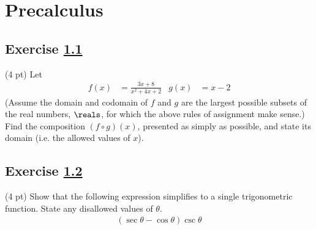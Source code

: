 %
%
%
%

%
%

\section{Precalculus}

\subsection{Exercise \ref{sec : Precalculus Q1}}
\label{sec : Precalculus Q1}


(4 pt) Let
\begin{align*}
f(x)
&=
\frac{3 x + 8}{x^{2} + 4 x + 2}
&
g(x)
&=
x - 2
\end{align*}
(Assume the domain and codomain of $f$ and $g$ are the largest possible subsets of the real numbers, $\reals$, for which the above rules of assignment make sense.) Find the composition $(f \circ g)(x)$, presented as simply as possible, and state its domain (i.e. the allowed values of $x$).




\subsection{Exercise \ref{sec : Precalculus Q2}}
\label{sec : Precalculus Q2}


(4 pt) Show that the following expression simplifies to a single trigonometric function. State any disallowed values of $\theta$.
\begin{align*}
(\sec \theta - \cos \theta) \csc \theta
\end{align*}


